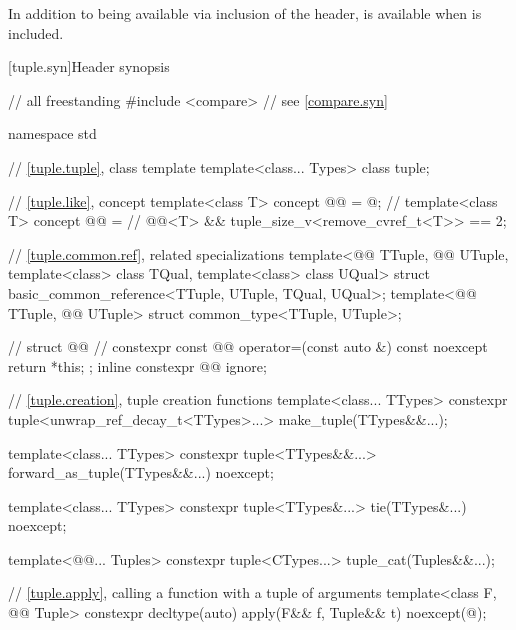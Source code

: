 \pnum
In addition to being available via inclusion of the  header,
 is available when
 is included.

[tuple.syn]{Header  synopsis}

%
\begin{codeblock}
// all freestanding
#include <compare>              // see \ref{compare.syn}

namespace std {
  // \ref{tuple.tuple}, class template 
  template<class... Types>
    class tuple;

  // \ref{tuple.like}, concept 
  template<class T>
    concept @@ = @\seebelownc@;         // \expos
  template<class T>
    concept @@ =                     // \expos
      @@<T> && tuple_size_v<remove_cvref_t<T>> == 2;

  // \ref{tuple.common.ref},  related specializations
  template<@@ TTuple, @@ UTuple,
           template<class> class TQual, template<class> class UQual>
    struct basic_common_reference<TTuple, UTuple, TQual, UQual>;
  template<@@ TTuple, @@ UTuple>
    struct common_type<TTuple, UTuple>;

  // 
  struct @@ {                      // \expos
    constexpr const @@
      operator=(const auto &) const noexcept { return *this; }
  };
  inline constexpr @@ ignore;

  // \ref{tuple.creation}, tuple creation functions
  template<class... TTypes>
    constexpr tuple<unwrap_ref_decay_t<TTypes>...> make_tuple(TTypes&&...);

  template<class... TTypes>
    constexpr tuple<TTypes&&...> forward_as_tuple(TTypes&&...) noexcept;

  template<class... TTypes>
    constexpr tuple<TTypes&...> tie(TTypes&...) noexcept;

  template<@@... Tuples>
    constexpr tuple<CTypes...> tuple_cat(Tuples&&...);

  // \ref{tuple.apply}, calling a function with a tuple of arguments
  template<class F, @@ Tuple>
    constexpr decltype(auto) apply(F&& f, Tuple&& t) noexcept(@\seebelow@);

}
\end{codeblock}
